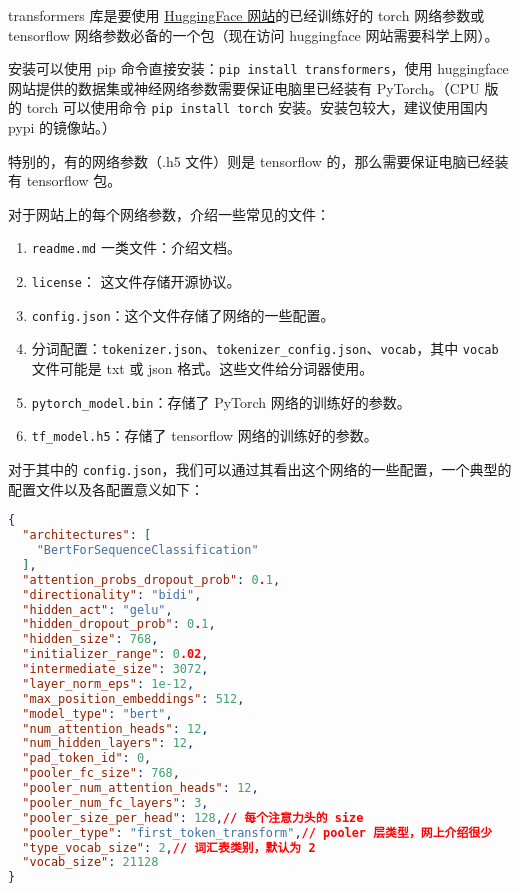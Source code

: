 
\begin{issues}
\issueDraft
\end{issues}

transformers 库是要使用 \href{https://huggingface.co}{HuggingFace 网站}的已经训练好的 torch 网络参数或 tensorflow 网络参数必备的一个包（现在访问 huggingface 网站需要科学上网）。

安装可以使用 pip 命令直接安装：\verb`pip install transformers`，使用 huggingface 网站提供的数据集或神经网络参数需要保证电脑里已经装有 PyTorch。（CPU 版的 torch 可以使用命令 \verb`pip install torch` 安装。安装包较大，建议使用国内 pypi 的镜像站。）

特别的，有的网络参数（.h5 文件）则是 tensorflow 的，那么需要保证电脑已经装有 tensorflow 包。

对于网站上的每个网络参数，介绍一些常见的文件：
\begin{enumerate}
\item \verb`readme.md` 一类文件：介绍文档。
\item \verb`license`： 这文件存储开源协议。
\item \verb`config.json`：这个文件存储了网络的一些配置。
\item 分词配置：\verb`tokenizer.json`、\verb`tokenizer_config.json`、\verb`vocab`，其中 \verb`vocab` 文件可能是 txt 或 json 格式。这些文件给分词器使用。
\item \verb`pytorch_model.bin`：存储了 PyTorch 网络的训练好的参数。
\item \verb`tf_model.h5`：存储了 tensorflow 网络的训练好的参数。
\end{enumerate}

对于其中的 \verb`config.json`，我们可以通过其看出这个网络的一些配置，一个典型的配置文件以及各配置意义如下：
\begin{lstlisting}[language=json]
{
  "architectures": [
    "BertForSequenceClassification"
  ],
  "attention_probs_dropout_prob": 0.1,
  "directionality": "bidi",
  "hidden_act": "gelu",
  "hidden_dropout_prob": 0.1,
  "hidden_size": 768,
  "initializer_range": 0.02,
  "intermediate_size": 3072,
  "layer_norm_eps": 1e-12,
  "max_position_embeddings": 512,
  "model_type": "bert",
  "num_attention_heads": 12,
  "num_hidden_layers": 12,
  "pad_token_id": 0,
  "pooler_fc_size": 768,
  "pooler_num_attention_heads": 12,
  "pooler_num_fc_layers": 3,
  "pooler_size_per_head": 128,// 每个注意力头的 size
  "pooler_type": "first_token_transform",// pooler 层类型，网上介绍很少
  "type_vocab_size": 2,// 词汇表类别，默认为 2
  "vocab_size": 21128
}
\end{lstlisting}

